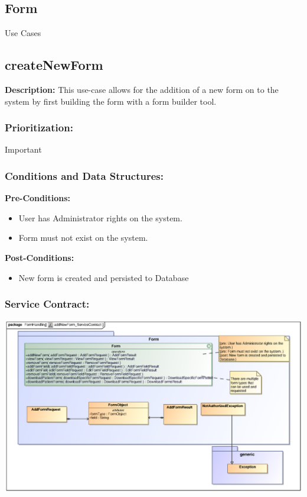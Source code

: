 
\newpage
\setlength{\voffset}{-3cm}

\begin{center}
\section{\textbf{\huge{Form}}}

\Large{Use Cases}
\end{center}


\subsection{createNewForm}
\textbf{Description:}
This use-case allows for the addition of a new form on to the system by first building the form with a form builder tool.
\subsubsection{Prioritization:}
Important
\subsubsection{Conditions and Data Structures:}
\textbf{Pre-Conditions:}
\begin{itemize}
	\item User has Administrator rights on the system.
	\item Form must not exist on the system.
\end{itemize}

\textbf{Post-Conditions:}	
\begin{itemize}
	\item New form is created and persisted to Database
\end{itemize}
\subsubsection{Service Contract:} 
\includegraphics[width=1\linewidth]{./Graphics/FormUseCaseDiagrams/addNewForm_ServiceContract}
